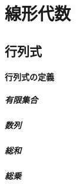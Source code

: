 \documentclass[autodetect-engine,dvipdfmx-if-dvi,ja=standard,a4paper,12pt]{bxjsbook}
\begin{document}
	\part{線形代数}
		\chapter{行列式}
			\subsection{行列式の定義}
				\subsubsection{有限集合}
				\subsubsection{数列}
				\subsubsection{総和}
				\subsubsection{総乗}
				
\end{document}
